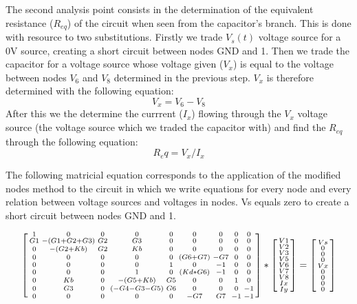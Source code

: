 The second analysis point consists in the determination of the equivalent resistance ($R_{eq}$) of the circuit when seen from the capacitor's branch. This is done with resource to two substitutions. Firstly we trade $V_s(t)$ voltage source for a 0V source, creating a short circuit between nodes GND and 1. Then we trade the capacitor for a voltage source whose voltage given ($V_x$) is equal to the voltage between nodes $V_6$ and $V_8$ determined in the previous step. $V_x$ is therefore determined with the following equation:
\begin{equation}
V_x=V_6-V_8
\end{equation}
After this we the determine the currrent ($I_x$) flowing through the $V_x$ voltage source (the voltage source which we traded the capacitor with) and find the $R_{eq}$ through the following equation:
\begin{equation}
R_eq=V_x/I_x
\end{equation}

The following matricial equation corresponds to the application of the modified nodes method to the circuit in which we write equations for every node and every relation between voltage sources and voltages in nodes. Vs equals zero to create a short circuit between nodes GND and 1.

\begin{equation}
\begin{bsmallmatrix}
1 & 0 & 0 & 0 & 0 & 0 & 0 & 0 & 0\\
G1 & -(G1 + G2 + G3) & G2 & G3 & 0 & 0 & 0 & 0 & 0\\
0 & -(G2+Kb) & G2 & Kb & 0 & 0 & 0 & 0 & 0\\
0 & 0 & 0 & 0 & 0 & (G6 + G7) & -G7 & 0 & 0\\
0 & 0 & 0 & 0 & 1 & 0 & -1 & 0 & 0\\
0 & 0 & 0 & 1 & 0 & (Kd * G6) & -1 & 0 & 0\\
0 & Kb & 0 & -(G5 + Kb) & G5 & 0 & 0 & 1 & 0\\
0 & G3 & 0 & (-G4-G3-G5) & G6 & 0 & 0 & 0 & -1\\
0 & 0 & 0 & 0 & 0 & -G7 & G7 & -1 & -1
\end{bsmallmatrix}
*
\begin{bsmallmatrix}
V1\\V2\\V3\\V5\\V6\\V7\\V8\\Ix\\Iy
\end{bsmallmatrix}
=
\begin{bsmallmatrix}
Vs\\0\\0\\0\\Vx\\0\\0\\0\\0
\end{bsmallmatrix}
\end{equation}

